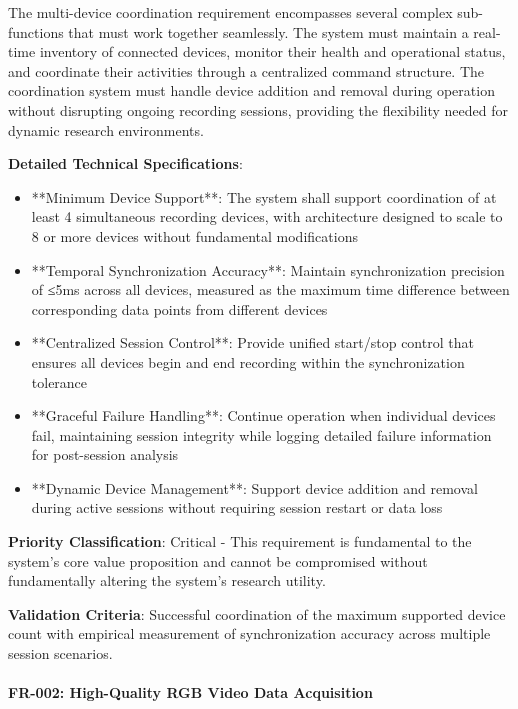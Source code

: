 \documentclass[12pt,a4paper]{article}
\begin{document}
The multi-device coordination requirement encompasses several complex sub-functions that must work together seamlessly.
The system must maintain a real-time inventory of connected devices, monitor their health and operational status, and
coordinate their activities through a centralized command structure. The coordination system must handle device addition
and removal during operation without disrupting ongoing recording sessions, providing the flexibility needed for dynamic
research environments.

\textbf{Detailed Technical Specifications}:

\begin{itemize}
\item **Minimum Device Support**: The system shall support coordination of at least 4 simultaneous recording devices, with
  architecture designed to scale to 8 or more devices without fundamental modifications
\item **Temporal Synchronization Accuracy**: Maintain synchronization precision of ≤5ms across all devices, measured as the
  maximum time difference between corresponding data points from different devices
\item **Centralized Session Control**: Provide unified start/stop control that ensures all devices begin and end recording
  within the synchronization tolerance
\item **Graceful Failure Handling**: Continue operation when individual devices fail, maintaining session integrity while
  logging detailed failure information for post-session analysis
\item **Dynamic Device Management**: Support device addition and removal during active sessions without requiring session
  restart or data loss

\end{itemize}
\textbf{Priority Classification}: Critical - This requirement is fundamental to the system's core value proposition and
cannot be compromised without fundamentally altering the system's research utility.

\textbf{Validation Criteria}: Successful coordination of the maximum supported device count with empirical measurement of
synchronization accuracy across multiple session scenarios.

\paragraph{FR-002: High-Quality RGB Video Data Acquisition}
\end{document}
